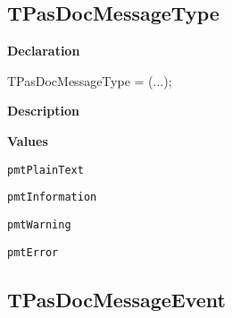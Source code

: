 \documentclass{report}
\newif\ifpdf
\begin{document}
\subsection*{TPasDocMessageType}
\fi
\label{PasDoc_Types-TPasDocMessageType}
\begin{list}{}{
\setlength{\itemindent}{0cm}
\setlength{\listparindent}{0cm}
\setlength{\leftmargin}{\evensidemargin}
\addtolength{\leftmargin}{\tmplength}
\settowidth{\labelsep}{X}
\addtolength{\leftmargin}{\labelsep}
\setlength{\labelwidth}{\tmplength}
}
\item[\textbf{Declaration}\hfill]
\ifpdf
\begin{flushleft}
\fi
\begin{ttfamily}
TPasDocMessageType = (...);\end{ttfamily}

\ifpdf
\end{flushleft}
\fi

\par
\item[\textbf{Description}]
 \item[\textbf{Values}]
\begin{description}
\item[\texttt{pmtPlainText}] \label{PasDoc_Types-pmtPlainText}
\index{}
 
\item[\texttt{pmtInformation}] \label{PasDoc_Types-pmtInformation}
\index{}
 
\item[\texttt{pmtWarning}] \label{PasDoc_Types-pmtWarning}
\index{}
 
\item[\texttt{pmtError}] \label{PasDoc_Types-pmtError}
\index{}
 
\end{description}


\end{list}
\ifpdf
\subsection*{\large{\textbf{TPasDocMessageEvent}}\normalsize\hspace{1ex}\hrulefill}
\else
\end{document}
